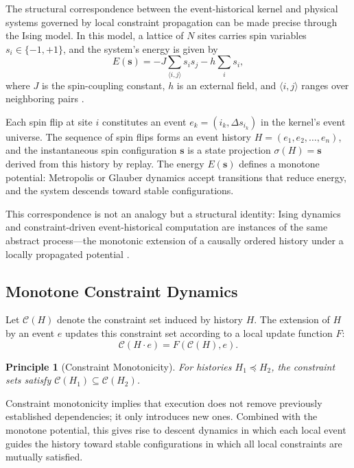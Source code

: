 \documentclass[12pt]{article}
\newtheorem{principle}{Principle}
\begin{document}
The structural correspondence between the event-historical kernel and physical systems governed
by local constraint propagation can be made precise through the Ising model. In this model, a
lattice of $N$ sites carries spin variables $s_i \in \{-1, +1\}$, and the system's energy is
given by
\[
E(\mathbf{s}) = -J \sum_{\langle i,j \rangle} s_i s_j - h \sum_i s_i,
\]
where $J$ is the spin-coupling constant, $h$ is an external field, and $\langle i, j \rangle$
ranges over neighboring pairs \cite{ising1925}.

Each spin flip at site $i$ constitutes an event $e_k = (i_k, \Delta s_{i_k})$ in the kernel's
event universe. The sequence of spin flips forms an event history
$H = (e_1, e_2, \ldots, e_n)$, and the instantaneous spin configuration $\mathbf{s}$ is a
state projection $\sigma(H) = \mathbf{s}$ derived from this history by replay. The energy
$E(\mathbf{s})$ defines a monotone potential: Metropolis or Glauber dynamics accept transitions
that reduce energy, and the system descends toward stable configurations.

This correspondence is not an analogy but a structural identity: Ising dynamics and
constraint-driven event-historical computation are instances of the same abstract process---the
monotonic extension of a causally ordered history under a locally propagated potential
\cite{brush1967, mezard1987}.

\subsection{Monotone Constraint Dynamics}

Let $\mathcal{C}(H)$ denote the constraint set induced by history $H$. The extension of $H$
by an event $e$ updates this constraint set according to a local update function $F$:
\[
\mathcal{C}(H \cdot e) = F(\mathcal{C}(H), e).
\]

\begin{principle}[Constraint Monotonicity]
For histories $H_1 \preceq H_2$, the constraint sets satisfy
$\mathcal{C}(H_1) \subseteq \mathcal{C}(H_2)$.
\end{principle}

Constraint monotonicity implies that execution does not remove previously established
dependencies; it only introduces new ones. Combined with the monotone potential, this gives
rise to descent dynamics in which each local event guides the history toward stable
configurations in which all local constraints are mutually satisfied.
\end{document}
